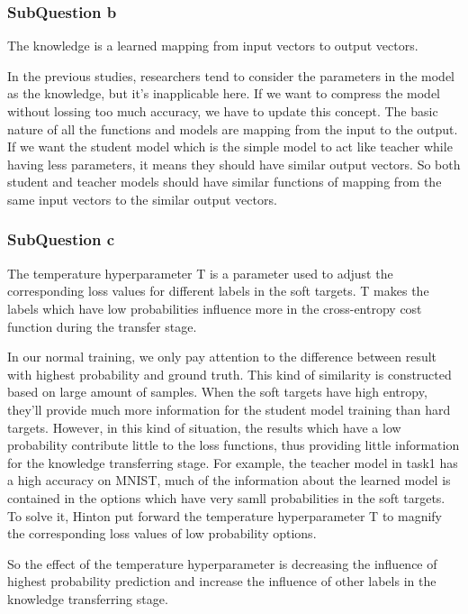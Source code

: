 \documentclass[conference]{IEEEtran}
\begin{document}
\subsubsection{SubQuestion b}
The knowledge is a learned mapping from input vectors to output vectors.\par
In the previous studies, researchers tend to consider the parameters in the model as the knowledge, but it's inapplicable here. If we want to compress the model without lossing too much accuracy, we have to update this concept. 
The basic nature of all the functions and models are mapping from the input to the output. 
If we want the student model which is the simple model to act like teacher while having less parameters, it means they should have similar output vectors. So both student and teacher models should have similar functions of mapping from the same input vectors to the similar output vectors.
\subsubsection{SubQuestion c}
The temperature hyperparameter T is a parameter used to adjust the corresponding loss values for different labels in the soft targets. T makes the labels which have low probabilities influence more in the cross-entropy cost function during the transfer stage.\par
In our normal training, we only pay attention to the difference between result with highest probability and ground truth. This kind of similarity is constructed based on large amount of samples.
When the soft targets have high entropy, they'll provide much more information for the student model training than hard targets. However, in this kind of situation, the results which have a low probability contribute little to the loss functions, thus providing little information for the knowledge transferring stage.
For example, the teacher model in task1 has a high accuracy on MNIST, much of the information about the learned model is contained in the options which have very samll probabilities in the soft targets. To solve it, Hinton\cite{b6} put forward the temperature hyperparameter T to magnify the corresponding loss values of low probability options.
\par
So the effect of the temperature hyperparameter is decreasing the influence of highest probability prediction and increase the influence of other labels in the knowledge transferring stage.
\end{document}
